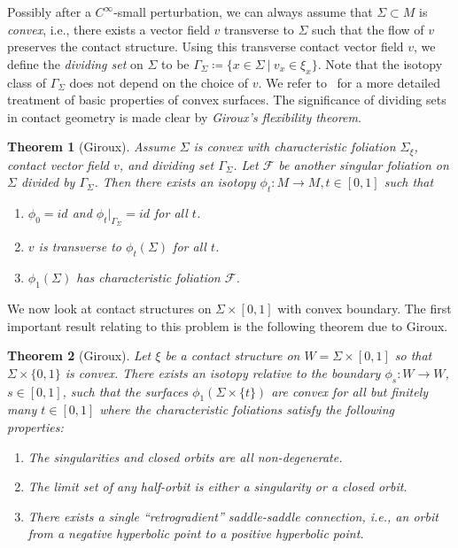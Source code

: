 \documentclass[12pt]{amsart}
\newtheorem{thm}{Theorem}[section]
\theoremstyle{remark}
\newcommand{\be}{\begin{enumerate}}
\newcommand{\ee}{\end{enumerate}}
\begin{document}
Possibly after a $C^{\infty}$-small perturbation, we can always assume that $\Sigma\subset M$ is {\em convex}, i.e., there exists a vector field $v$ transverse to $\Sigma$ such that the flow of $v$ preserves the contact structure. Using this transverse contact vector field $v$, we define the {\em dividing set} on $\Sigma$ to be $\Gamma_\Sigma\coloneqq \{x\in\Sigma~|~v_x \in \xi_x\}$. Note that the isotopy class of $\Gamma_\Sigma$ does not depend on the choice of $v$. We refer to~\cite{Gi} for a more detailed treatment of basic properties of convex surfaces. The significance of dividing sets in contact geometry is made clear by {\em Giroux's flexibility theorem}.

\begin{thm}[Giroux] \label{Flex}
Assume $\Sigma$ is convex with characteristic foliation $\Sigma_\xi$, contact vector field $v$, and dividing set $\Gamma_\Sigma$. Let $\mathscr{F}$ be another singular foliation on $\Sigma$ divided by $\Gamma_\Sigma$. Then there exists an isotopy $\phi_t: M \to M, t\in [0,1]$ such that

\be

\item{$\phi_0=id$ and $\phi_t|_{\Gamma_\Sigma}=id$ for all $t$.}

\item{$v$ is transverse to $\phi_t(\Sigma)$ for all $t$.}

\item{$\phi_1(\Sigma)$ has characteristic foliation $\mathscr{F}$.}

\ee
\end{thm}

We now look at contact structures on $\Sigma\times[0,1]$ with convex boundary. The first important result relating to this problem is the following theorem due to Giroux.

\begin{thm}[Giroux] \label{film pic}
Let $\xi$ be a contact structure on $W=\Sigma\times[0,1]$ so that $\Sigma\times\{0,1\}$ is convex. There exists an isotopy relative to the boundary $\phi_s:W \to W$, $s\in[0,1]$, such that the surfaces $\phi_1(\Sigma\times\{t\})$ are convex for all but finitely many $t\in[0,1]$ where the characteristic foliations satisfy the following properties:
\be
\item{The singularities and closed orbits are all non-degenerate.}
\item{The limit set of any half-orbit is either a singularity or a closed orbit.}
\item{There exists a single ``retrogradient'' saddle-saddle connection, i.e., an orbit from a negative hyperbolic point to a positive hyperbolic point.}
\ee
\end{thm}
\end{document}
